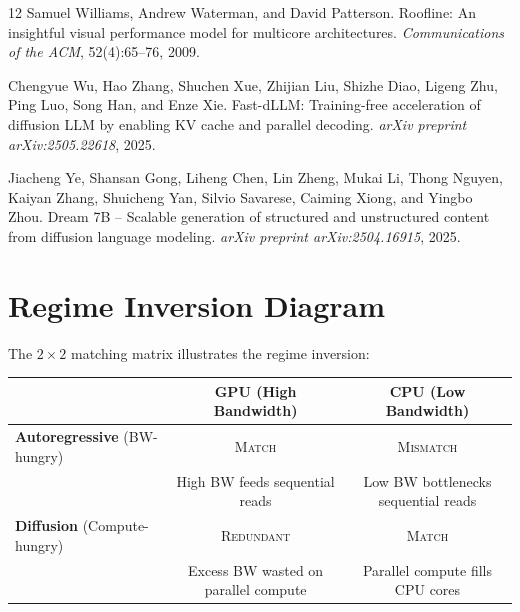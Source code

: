 \documentclass[11pt]{article}
\begin{document}
\begin{thebibliography}{12}
Samuel Williams, Andrew Waterman, and David Patterson.
\newblock Roofline: An insightful visual performance model for multicore
  architectures.
\newblock \emph{Communications of the ACM}, 52(4):65--76, 2009.

Chengyue Wu, Hao Zhang, Shuchen Xue, Zhijian Liu, Shizhe Diao, Ligeng Zhu,
  Ping Luo, Song Han, and Enze Xie.
\newblock Fast-dLLM: Training-free acceleration of diffusion LLM by enabling KV
  cache and parallel decoding.
\newblock \emph{arXiv preprint arXiv:2505.22618}, 2025.

Jiacheng Ye, Shansan Gong, Liheng Chen, Lin Zheng, Mukai Li, Thong Nguyen,
  Kaiyan Zhang, Shuicheng Yan, Silvio Savarese, Caiming Xiong, and Yingbo Zhou.
\newblock Dream 7B -- Scalable generation of structured and unstructured content
  from diffusion language modeling.
\newblock \emph{arXiv preprint arXiv:2504.16915}, 2025.

\end{thebibliography}


\appendix

\section{Regime Inversion Diagram}


The $2 \times 2$ matching matrix illustrates the regime inversion:

\begin{table}[h]
\centering
\begin{tabular}{lcc}
\toprule
 & \textbf{GPU} (High Bandwidth) & \textbf{CPU} (Low Bandwidth) \\
\midrule
\textbf{Autoregressive} (BW-hungry) & \textsc{Match} & \textsc{Mismatch} \\
 & High BW feeds sequential reads & Low BW bottlenecks sequential reads \\
\midrule
\textbf{Diffusion} (Compute-hungry) & \textsc{Redundant} & \textsc{Match} \\
 & Excess BW wasted on parallel compute & Parallel compute fills CPU cores \\
\bottomrule
\end{tabular}
\end{table}
\end{document}
